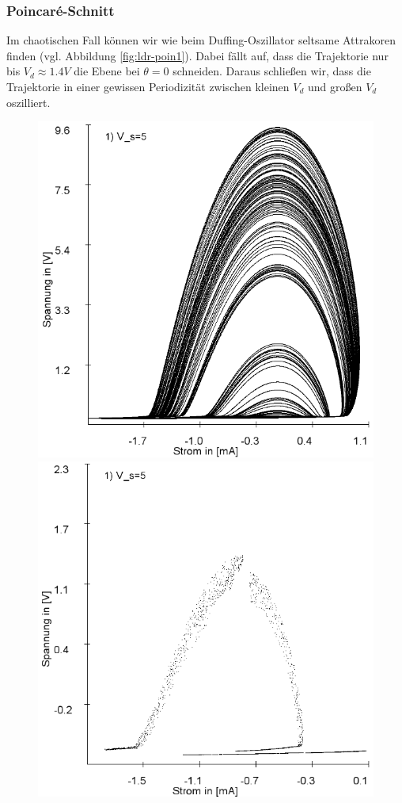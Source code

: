 \documentclass[11,5pt, twoside]{article}
\begin{document}
\subsubsection{Poincaré-Schnitt}
 Im chaotischen Fall können wir wie beim Duffing-Oszillator seltsame Attrakoren finden (vgl. Abbildung \ref{fig:ldr-poin1}). Dabei fällt auf, dass die Trajektorie nur bis $V_d\approx1.4V$ die Ebene bei $\theta=0$ schneiden. Daraus schließen wir, dass die Trajektorie in einer gewissen Periodizität zwischen kleinen $V_d$ und großen $V_d$ oszilliert.
\begin{figure}[!htbp]
\centering
\includegraphics[scale=0.33]{schwing-v5-euler}
\includegraphics[scale=0.33]{schwing-v5-euler-poincare}

\end{figure}
\end{document}
